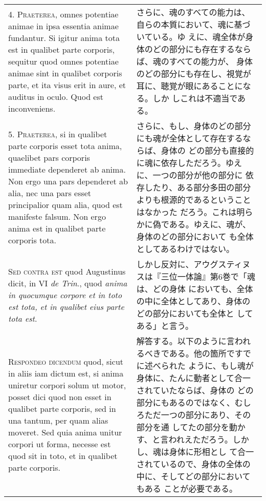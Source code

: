 \documentclass[paper=a4paper,fontsize=10pt,jafontsize=9pt,titlepage]{jlreq}
\begin{document}
\begin{longtable}{p{21em}p{21em}}
4. {\scshape Praeterea}, omnes potentiae animae in ipsa essentia
animae fundantur. Si igitur anima tota est in qualibet parte corporis,
sequitur quod omnes potentiae animae sint in qualibet corporis parte,
et ita visus erit in aure, et auditus in oculo. Quod est inconveniens.

 &

 さらに、魂のすべての能力は、自らの本質において、魂に基づいている。ゆ
 えに、魂全体が身体のどの部分にも存在するならば、魂のすべての能力が、
 身体のどの部分にも存在し、視覚が耳に、聴覚が眼にあることになる。しか
 しこれは不適当である。
\\



5. {\scshape Praeterea}, si in qualibet parte corporis esset tota
anima, quaelibet pars corporis immediate dependeret ab anima. Non ergo
una pars dependeret ab alia, nec una pars esset principalior quam
alia, quod est manifeste falsum. Non ergo anima est in qualibet parte
corporis tota.

 &

 さらに、もし、身体のどの部分にも魂が全体として存在するならば、身体の
 どの部分も直接的に魂に依存しただろう。ゆえに、一つの部分が他の部分に
 依存したり、ある部分多田の部分よりも根源的であるということはなかった
 だろう。これは明らかに偽である。ゆえに、魂が、身体のどの部分において
 も全体としてあるわけではない。
 
\\



 {\scshape Sed contra est} quod Augustinus dicit, in VI {\itshape de
 Trin}., quod {\itshape anima in quocumque corpore et in toto est tota, et in
 qualibet eius parte tota est}.

 &

 しかし反対に、アウグスティヌスは『三位一体論』第6巻で「魂は、どの身体
 においても、全体の中に全体としてあり、身体のどの部分においても全体と
 してある」と言う。

\\



 {\scshape Respondeo dicendum} quod, sicut in aliis iam dictum est, si
 anima uniretur corpori solum ut motor, posset dici quod non esset in
 qualibet parte corporis, sed in una tantum, per quam alias
 moveret. Sed quia anima unitur corpori ut forma, necesse est quod sit
 in toto, et in qualibet parte corporis. 

&

 解答する。以下のように言われるべきである。他の箇所ですでに述べられた
 ように、もし魂が身体に、たんに動者として合一されていたならば、身体の
 どの部分にもあるのではなく、むしろただ一つの部分にあり、その部分を通
 してたの部分を動かす、と言われえただろう。しかし、魂は身体に形相とし
 て合一されているので、身体の全体の中に、そしてどの部分においてもある
 ことが必要である。
 

\end{longtable}
\end{document}

